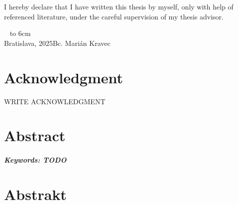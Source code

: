 \documentclass[12pt, twoside, openany]{book}
\def\mfauthor{Bc. Marián Kravec}
\def\mfplacedate{Bratislava, 2025}
\begin{document}




{~}\vspace{12cm}

\noindent
\begin{minipage}{0.25\textwidth}~\end{minipage}
\thispagestyle{empty}
\begin{minipage}{0.75\textwidth}
I hereby declare that I have written this thesis by myself, only with help of referenced literature, under the careful supervision of my thesis advisor.
\newline \newline
\end{minipage}
\vfill
~ \hfill {\hbox to 6cm{\dotfill}} \\
\mfplacedate \hfill \mfauthor
\vfill\eject \cleardoublepage




\newpage
\thispagestyle{empty}
\chapter*{Acknowledgment}\label{chap:thank_you}
WRITE ACKNOWLEDGMENT


\vfill\eject 



\newpage 
\thispagestyle{empty}
\chapter*{Abstract}\label{chap:abstract_en}


\paragraph*{Keywords: TODO}  


\newpage 
\thispagestyle{empty}
\chapter*{Abstrakt}\label{chap:abstract_sk}

\end{document}

